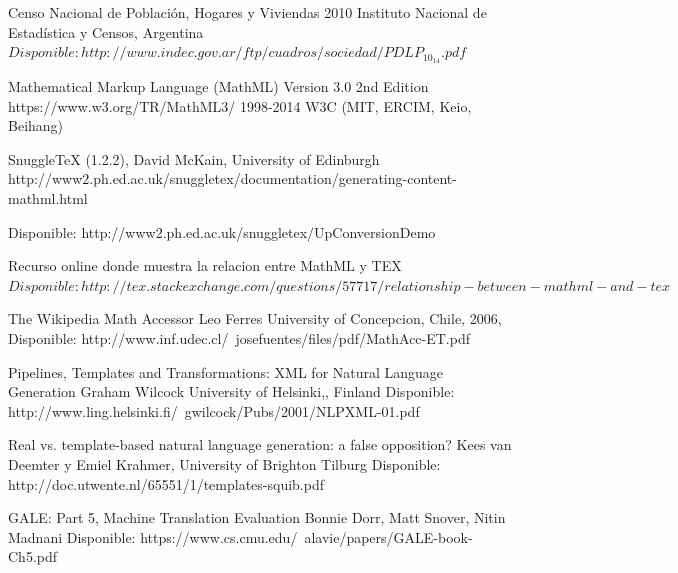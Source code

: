 \documentclass[
11pt, %
oneside, %
english, %
doublespacing, %
nolistspacing, %
parskip, %
parident,
headsepline, %
]{MastersDoctoralThesis} %
\begin{document}
\appendix %



%
%

\renewcommand{\bibname}{Referencias}

\begin{thebibliography}{99}

{\small

Censo Nacional de Población,
Hogares y Viviendas 2010
Instituto Nacional de Estadística y Censos, Argentina
$Disponible: http://www.indec.gov.ar/ftp/cuadros/sociedad/PDLP_10_14.pdf$

Mathematical Markup Language (MathML) Version 3.0 2nd Edition
https://www.w3.org/TR/MathML3/
1998-2014 W3C (MIT, ERCIM, Keio, Beihang)

SnuggleTeX (1.2.2), David McKain, University of Edinburgh
http://www2.ph.ed.ac.uk/snuggletex/documentation/generating-content-mathml.html

Disponible: http://www2.ph.ed.ac.uk/snuggletex/UpConversionDemo

Recurso online donde muestra la relacion entre MathML y TEX
$Disponible: http://tex.stackexchange.com/questions/57717/relationship-between-mathml-and-tex$

The Wikipedia Math Accessor
Leo Ferres
University of Concepcion, Chile, 2006, Disponible: http://www.inf.udec.cl/~josefuentes/files/pdf/MathAcc-ET.pdf

Pipelines, Templates and Transformations: XML for Natural Language Generation
Graham Wilcock
University of Helsinki,, Finland
Disponible: http://www.ling.helsinki.fi/~gwilcock/Pubs/2001/NLPXML-01.pdf

Real vs. template-based natural language generation: a false opposition?
Kees van Deemter y Emiel Krahmer,
University of Brighton Tilburg
Disponible: http://doc.utwente.nl/65551/1/templates-squib.pdf

GALE: Part 5,  Machine Translation Evaluation
Bonnie Dorr, Matt Snover, Nitin Madnani
Disponible: https://www.cs.cmu.edu/~alavie/papers/GALE-book-Ch5.pdf

}
\end{thebibliography}

\end{document}

